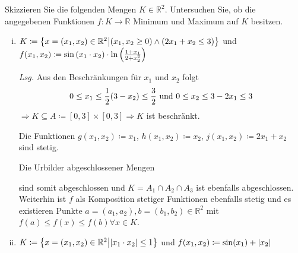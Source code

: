 \documentclass{scrreprt}
\begin{document}
Skizzieren Sie die folgenden Mengen $K \in \mathbb{R}^2$.
Untersuchen Sie, ob die angegebenen Funktionen $f: K \to \mathbb{R}$
Minimum und Maximum auf $K$ besitzen.
\begin{enumerate}[(i)]
\item $K \coloneqq \qty{x = \qty(x_1, x_2) \in \mathbb{R}^2 \middle|
    (x_1, x_2 \geq 0) \land (2x_1 + x_2 \leq 3)}$ und
  $f\qty(x_1, x_2) \coloneqq \sin\qty(x_1 \cdot x_2) \cdot
  \ln\qty(\frac{1 + x_1}{2 + x_2^2})$

  \textit{Lsg.} Aus den Beschränkungen für $x_1$ und $x_2$ folgt
  \[
    0 \leq x_1 \leq \frac{1}{2}\qty(3- x_2) \leq \frac{3}{2}
    \text{ und }
    0 \leq x_2 \leq 3 - 2x_1 \leq 3
  \]
  $\Rightarrow K \subseteq A \coloneqq [0, 3] \times [0, 3]
  \Rightarrow K$ ist beschränkt.

  \begin{center}
  \end{center}
  Die Funktionen $g(x_1, x_2) \coloneqq x_1$, $h(x_1, x_2) \coloneqq x_2$,
  $j(x_1, x_2) \coloneqq 2x_1 + x_2$ sind stetig.

  Die Urbilder abgeschlossener Mengen
  \begin{flalign*}
    A_1 &= g^{-1}([0, \infty)) = [0, \infty) \times {} & \\
    A_2 &= h^{-1}([0, \infty)) =  \times [0, \infty) \\
    A_3 &= j^{-1}((-\infty, 3]) = \qty{(x_1, x_2) \in \mathbb{R}^2 \middle|
      (x_1 \in \mathbb{R}) \land (x_2 \leq 3 - 2x_1)}
  \end{flalign*}
  sind somit abgeschlossen und
  $K = A_1 \cap A_2 \cap A_3$ ist ebenfalls abgeschlossen.
  Weiterhin ist $f$ als Komposition stetiger Funktionen ebenfalls stetig
  und es existieren Punkte $a = (a_1, a_2), b = (b_1, b_2) \in \mathbb{R}^2$
  mit $f(a) \leq f(x) \leq f(b) \forall x \in K$.

\item $K \coloneqq \qty{x = \qty(x_1, x_2) \in \mathbb{R}^2 \middle|
    \abs{x_1 \cdot x_2} \leq 1}$ und
  $f\qty(x_1, x_2) \coloneqq \sin(x_1) + \abs{x_2}$ \\


\end{enumerate}
\end{document}
